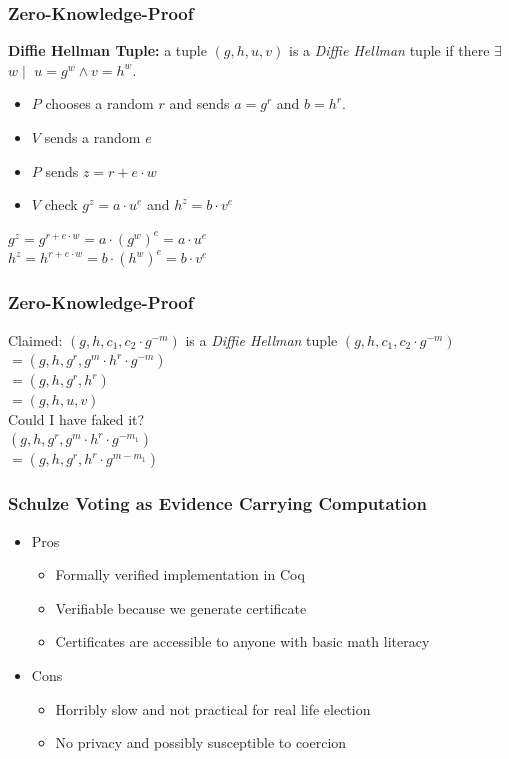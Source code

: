 \documentclass{beamer}
\begin{document}
\begin{frame}
\frametitle{Zero-Knowledge-Proof}
\textbf{Diffie Hellman Tuple:} a tuple $(g, h, u, v)$ is 
 a \textit{Diffie Hellman} tuple if there $\exists$ $w \mid$
 $u = g^w \land v = h^w$. 
 
 \begin{itemize}
 \item $P$ chooses a random $r$ and sends $a=g^r$ and $b = h^r$.
 \item $V$ sends a random $e$
 \item $P$ sends $z =r + e \cdot w$
 \item $V$ check $g^z = a \cdot u^e$ and $h^z = b\cdot v^e$ 
 \end{itemize}
 $g^z = g^{r + e \cdot w} = a \cdot (g^w)^e = a \cdot u^e $\\
 $h^z = h^{r + e \cdot w} = b \cdot (h^w)^e = b \cdot v^e$
\end{frame}

\begin{frame}
\frametitle{Zero-Knowledge-Proof}
{Claimed: $(g, h, c_{1}, c_{2} \cdot g^{-m})$ is a \textit{Diffie Hellman} tuple}
$(g, h, c_{1}, c_{2} \cdot g^{-m})$\\
$ = (g, h, g^r, g^m \cdot h^r \cdot g^{-m})$ \\
$ = (g, h, g^r, h^r)$ \\
$ = (g, h, u, v)$\\ 
{Could I have faked it?} \\
$(g, h, g^r, g^m \cdot h^r \cdot g^{-m_{1}})$ \\
$ = (g, h, g^r, h^r \cdot g^{m - m_{1}})$

\end{frame}


\begin{frame}
\frametitle{Schulze Voting as Evidence Carrying Computation}
\begin{itemize}[]
\item Pros 
\begin{itemize}
\item Formally verified implementation in Coq
\item Verifiable because we generate certificate
\item Certificates are accessible to anyone with 
      basic math literacy
\end{itemize}
\item Cons
\begin{itemize}
\item Horribly slow and not practical for real life election
\item No privacy and possibly susceptible to coercion
\end{itemize}
\end{itemize}
\end{frame}
\end{document}
